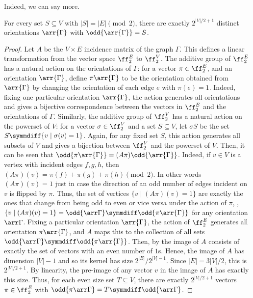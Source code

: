 \documentclass{toc}
\begin{document}
Indeed, we can say more.
\begin{lemma}\label{lem:linear}
  For every set $S \subseteq V$ with $|S| = |E| \pmod 2$, there are exactly
  $2^{|V|/2 + 1}$ distinct orientations $\arr{\Gamma}$ with $\odd{\arr{\Gamma}} = S$.
\end{lemma}
\begin{proof}
  Let $A$ be the $V \times E$ incidence matrix of the graph $\Gamma$. This defines a
  linear transformation from the vector space $\ff_{2}^{E}$ to $\ff_{2}^{V}$.
  The additive group of $\ff_{2}^{E}$ has a natural action on the orientations
  of $\Gamma$: for a vector $\pi \in \ff_{2}^{E}$, and an orientation $\arr{\Gamma}$,
  define $\pi\arr{\Gamma}$ to be the orientation obtained from $\arr{\Gamma}$ by changing
  the orientation of each edge $e$ with $\pi(e) = 1$. Indeed, fixing one
  particular orientation $\arr{\Gamma}$, the action generates all orientations and
  gives a bijective correspondence between the vectors in $\ff_{2}^{E}$ and the
  orientations of $\Gamma$. Similarly, the additive group of $\ff_{2}^{V}$ has a
  natural action on the powerset of $V$: for a vector $\sigma \in \ff_{2}^{V}$
  and a set $S \subseteq V$, let $\sigma S$ be the set $S \symmdiff \{v \mid
  \sigma(v) = 1\}$. Again, for any fixed set $S$, this action generates all
  subsets of $V$ and gives a bijection between $\ff_{2}^{V}$ and the powerset
  of $V$.
  Then, it can be seen that $\odd{\pi \arr{\Gamma}} = (A \pi) \odd{\arr{\Gamma}}$. Indeed,
  if $v \in V$ is a vertex with incident edges $f,g,h$, then $(A\pi)(v) =
  \pi(f)+\pi(g)+\pi(h) \pmod 2$. In other words $(A\pi)(v) = 1$ just in case the
  direction of an odd number of edges incident on $v$ is flipped by $\pi$. Thus,
  the set of vertices $\{v \mid (A\pi)(v) = 1\}$ are exactly the ones that
  change from being odd to even or vice versa under the action of $\pi$, \ie,
  $\{v \mid (A\pi)(v) = 1\} = \odd{\arr \Gamma} \symmdiff \odd{\pi \arr{\Gamma}}$ for any
  orientation $\arr \Gamma$.
  Fixing a particular orientation $\arr{\Gamma}$, the action of $\ff_{2}^{E}$
  generates all orientation $\pi\arr{\Gamma}$, and $A$ maps this to the collection of
  all sets $\odd{\arr \Gamma} \symmdiff \odd{\pi \arr{\Gamma}}$. Then, by
    the image
  of $A$ consists of exactly the set of vectors with an even number of $1$s.
  Hence, the image of $A$ has dimension $|V|-1$ and so its kernel has size
  $2^{|E|}/2^{|V|-1}$. Since $|E| = 3|V|/2$, this is $2^{|V|/2+1}$. By
  linearity, the pre-image of any vector $v$ in the image of $A$ has exactly
  this size. Thus, for each even size set $T \subseteq V$, there are exactly
  $2^{|V|/2+1}$ vectors $\pi \in \ff_{2}^{E}$ with $\odd{\pi \arr \Gamma} = T
  \symmdiff \odd{\arr \Gamma}$.
\end{proof}
\end{document}
